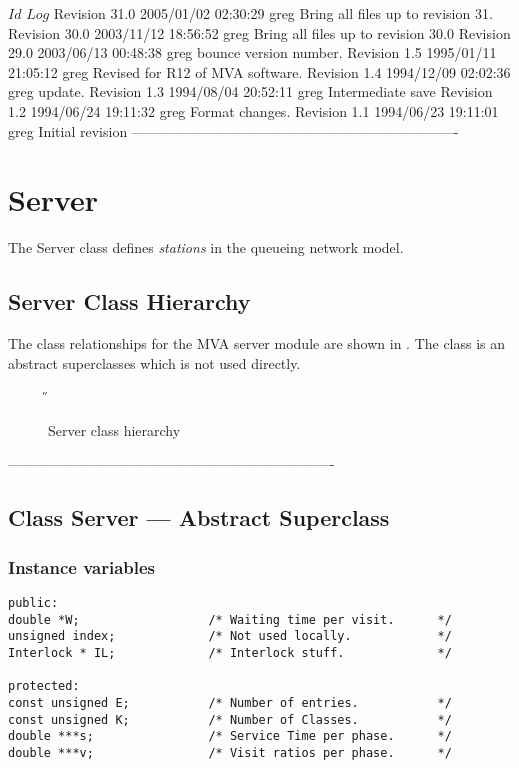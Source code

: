 \C 
\C $Id$
\C 
\C $Log$
\C Revision 31.0  2005/01/02 02:30:29  greg
\C Bring all files up to revision 31.
\C
\C Revision 30.0  2003/11/12 18:56:52  greg
\C Bring all files up to revision 30.0
\C
\C Revision 29.0  2003/06/13 00:48:38  greg
\C bounce version number.
\C
\C Revision 1.5  1995/01/11 21:05:12  greg
\C Revised for R12 of MVA software.
\C
\C Revision 1.4  1994/12/09  02:02:36  greg
\C update.
\C
\C Revision 1.3  1994/08/04  20:52:11  greg
\C Intermediate save
\C
\C Revision 1.2  1994/06/24  19:11:32  greg
\C Format changes.
\C
\C Revision 1.1  1994/06/23  19:11:01  greg
\C Initial revision
\C
\C ----------------------------------------------------------------------
\section{Server}
\label{sec:server}

The Server class defines {\em stations\/} in the queueing network
model.  


\subsection{Server Class Hierarchy}
\label{sec:server-hierarchy}

The class relationships for the MVA server module are shown in
.  The class
 is an abstract superclasses which is not used directly.

\begin{figure}[htbp]
  \label{fig:server}
  \begin{center}
    \T \tex \leavevmode 
    \caption{Server class hierarchy}
    \H {}
  \end{center}
\end{figure}

\htmlrule
\C
\C ----------------------------------------------------------------------
\C
\subsection{Class Server  --- Abstract Superclass}
\subsubsection{Instance variables}
\label{sec:server-ivars}

\begin{verbatim}
public:
double *W;                  /* Waiting time per visit.      */
unsigned index;             /* Not used locally.            */
Interlock * IL;             /* Interlock stuff.             */

protected:             
const unsigned E;           /* Number of entries.           */
const unsigned K;           /* Number of Classes.           */
double ***s;                /* Service Time per phase.      */
double ***v;                /* Visit ratios per phase.      */
\end{verbatim}

